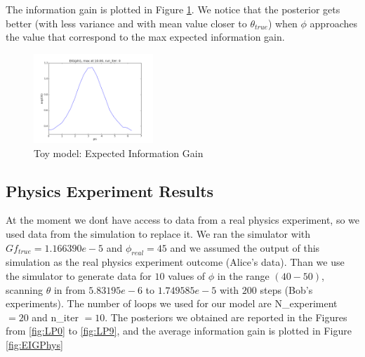 \documentclass[10pt,journal,compsoc]{IEEEtran}
\begin{document}
\begin{figure}
\end{figure}
The information gain is plotted in Figure \ref{fig:EIGPlot}. We notice that the posterior gets better (with less variance and with mean value closer to $\theta_{true}$) when $\phi$ approaches the value that correspond to the max expected information gain.  

\begin{figure}[ht!]
 \centering
  \includegraphics[width=0.4\textwidth]{images/EIG_average.png}
  \caption{\label{fig:EIGPlot} Toy model: Expected Information Gain}
\end{figure}

\subsection{Physics Experiment Results}
At the moment we don\'t have access to data from a real physics experiment, so we used data from the simulation to replace it. We ran the simulator with $Gf_{true}=1.166390e-{5}$ and $\phi_{real} = 45$ and we assumed the output of this simulation as the real physics experiment outcome (Alice's data). Than we use the simulator to generate data for $10$ values of $\phi$ in the range $(40-50)$, scanning $\theta$ in from $5.83195e-{6}$ to $1.749585e-{5}$ with $200$ steps (Bob's experiments). The number of loops we used for our model are N\_experiment$=20$ and n\_iter $= 10$. The posteriors we obtained are reported in the Figures from \ref{fig:LP0} to \ref{fig:LP9}, and the average information gain is plotted in Figure \ref{fig:EIGPhys}
\end{document}
